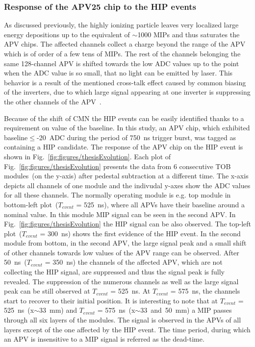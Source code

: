 

\subsubsection{Response of the APV25 chip to the HIP events}

As discussed previously, the highly ionizing particle leaves very localized large energy depositions up to the equivalent of $\sim$1000 MIPs and thus saturates the APV chips. The affected channels collect a charge beyond the range of the APV which is of order of a few tens of MIPs. The rest of the channels belonging the same 128-channel APV is shifted towards the low ADC values up to the point when the ADC value is so small, that no light can be emitted by laser. This behavior is a result of the mentioned cross-talk effect caused by common biasing of the inverters, due to which large signal appearing at one inverter is suppressing the other channels of the APV~\cite{Bainbridge:2004jc}. 

Because of the shift of CMN the HIP events can be easily identified thanks to a requirement on value of the baseline. In this study, an APV chip, which exhibited baseline$\leq$-20~ADC during the period of 750~ns trigger burst, was tagged as containing a  HIP candidate. The response of the APV chip on the HIP event is shown in Fig.~\ref{fig:figures/thesisEvolution}. Each plot of Fig.~\ref{fig:figures/thesisEvolution} presents the data from 6 consecutive TOB modules~(on the y-axis) after pedestal subtraction at a different time. The x-axis depicts all channels of one module and the indivudal y-axes show the ADC values for all these channels. The normally operating module is e.g. top module in bottom-left plot~($T_{event}$ = 525~ns), where all APVs have their baseline around a nominal value. In this module MIP signal can be seen in the second APV. In Fig.~\ref{fig:figures/thesisEvolution} the HIP signal can be also observed. The top-left plot~($T_{event}$ = 300~ns) shows the first evidence of the HIP event. In the second module from bottom, in the second APV, the large signal peak and a small shift of other channels towards low values of the APV range can be observed. After 50~ns~($T_{event}$ = 350~ns) the channels of the affected APV, which are not collecting the HIP signal, are suppressed and thus the signal peak is fully revealed. The suppression of the numerous channels as well as the large signal peak can be still observed at $T_{event}$ = 525~ns. At $T_{event}$ = 575~ns, the channels start to recover to their initial position. It is interesting to note that at $T_{event}$ = 525~ns~(x$\sim$33~mm) and $T_{event}$ = 575~ns~(x$\sim$33~and~50~mm) a MIP passes through all six layers of the modules. The signal is observed in the APVs of all layers except of the one affected by the HIP event. The time period, during which an APV is insensitive to a MIP signal is referred as the dead-time.

